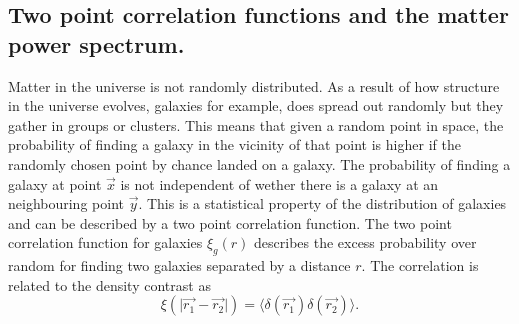 \subsection{Two point correlation functions and the matter power spectrum.} \label{sec:corrtheory}
Matter in the universe is not randomly distributed. As a result of how structure in the universe evolves, galaxies for example,
does spread out randomly but they gather in groups or clusters. This means that given a random point in space, the probability of finding
a galaxy in the vicinity of that point is higher if the randomly chosen point by chance landed on a galaxy. The probability of finding a galaxy
at point $\vec{x}$ is not independent of wether there is a galaxy at an neighbouring point $\vec{y}$. This is a statistical property of the distribution
of galaxies and can be described by a two point correlation function. The two point correlation function for galaxies $\xi_{g}(r)$ describes the excess probability
over random for finding two galaxies separated by a distance $r$. The correlation is related to the density contrast as
\begin{equation}
    \xi(\vert\vec{r_1}-\vec{r_2}\vert)=\langle\delta(\vec{r_1})\delta(\vec{r_2})\rangle.
\end{equation}

